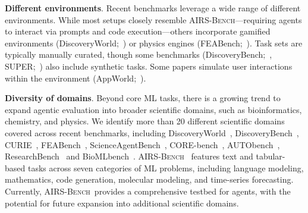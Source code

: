 \documentclass{fairmeta}
\newcommand{\airsbench}{\textsc{AIRS-Bench}}
\begin{document}
\textbf{Different environments}. Recent benchmarks leverage a wide range of different environments. While most setups closely resemble \airsbench---requiring agents to interact via prompts and code execution---others incorporate gamified environments (DiscoveryWorld;~\citealp{jansen2024discoveryworldvirtualenvironmentdeveloping}) or physics engines (FEABench;~\citealp{mudur2024feabench}). Task sets are typically manually curated, though some benchmarks (DiscoveryBench;~\citealp{majumder2024discoverybenchdatadrivendiscoverylarge}, SUPER;~\citealp{bogin2024superevaluatingagentssetting}) also include synthetic tasks. Some papers simulate user interactions within the environment (AppWorld;~\citealp{trivedi2024appworldcontrollableworldapps}).

\textbf{Diversity of domains}. Beyond core ML tasks, there is a growing trend to expand agentic evaluation into broader scientific domains, such as bioinformatics, chemistry, and physics. We identify more than 20 different scientific domains covered across recent benchmarks, including DiscoveryWorld~\citep{jansen2024discoveryworldvirtualenvironmentdeveloping}, DiscoveryBench~\citep{majumder2024discoverybenchdatadrivendiscoverylarge}, CURIE~\citep{cui2025curieevaluatingllmsmultitask}, FEABench~\citep{mudur2024feabench}, ScienceAgentBench~\citep{chen2025scienceagentbenchrigorousassessmentlanguage}, CORE-bench~\citep{siegel2024corebenchfosteringcredibilitypublished}, AUTObench~\citep{chen2025autobenchautomatedbenchmarkscientific},  ResearchBench~\citep{liu2025researchbenchbenchmarkingllmsscientific} and BioMLbench~\citep{biomlbench2025}. \airsbench~ features text and tabular-based tasks across seven categories of ML problems, including language modeling, mathematics, code generation, molecular modeling, and time-series forecasting. Currently, \airsbench~provides a comprehensive testbed for agents, with the potential for future expansion into additional scientific domains.
\end{document}
